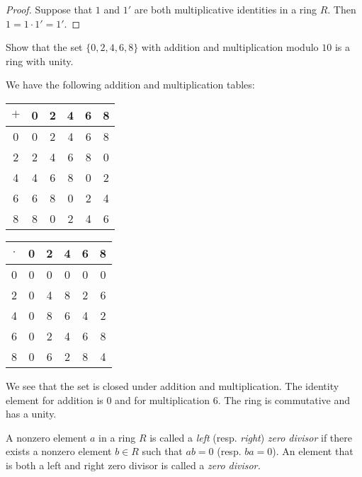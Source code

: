 \begin{proof}
    Suppose that \(1\) and \(1'\) are both multiplicative identities in a ring
    \(R\). Then \(1 = 1 \cdot 1' = 1'\).
\end{proof}

\begin{example}
    Show that the set \(\{0, 2, 4, 6, 8\}\) with addition and multiplication
    modulo \(10\) is a ring with unity.

    \begin{solution}
        We have the following addition and multiplication tables:
        \begin{center}
            \begin{tabular}{c|ccccc}
                \(+\) & 0 & 2 & 4 & 6 & 8 \\
                \hline
                0 & 0 & 2 & 4 & 6 & 8 \\
                2 & 2 & 4 & 6 & 8 & 0 \\
                4 & 4 & 6 & 8 & 0 & 2 \\
                6 & 6 & 8 & 0 & 2 & 4 \\
                8 & 8 & 0 & 2 & 4 & 6
            \end{tabular}
            \quad
            \begin{tabular}{c|ccccc}
                \(\cdot\) & 0 & 2 & 4 & 6 & 8 \\
                \hline
                0 & 0 & 0 & 0 & 0 & 0 \\
                2 & 0 & 4 & 8 & 2 & 6 \\
                4 & 0 & 8 & 6 & 4 & 2 \\
                6 & 0 & 2 & 4 & 6 & 8 \\
                8 & 0 & 6 & 2 & 8 & 4
            \end{tabular}
        \end{center}

        We see that the set is closed under addition and multiplication. The
        identity element for addition is \(0\) and for multiplication \(6\). The
        ring is commutative and has a unity.
    \end{solution}
\end{example}

\begin{definition}
    A nonzero element \(a\) in a ring \(R\) is called a \emph{left} (resp.
    \emph{right}) \emph{zero divisor }if there exists a nonzero element \(b \in
    R\) such that \(ab = 0\) (resp. \(ba = 0\)). An element that is both a left
    and right zero divisor is called a \emph{zero divisor.}
\end{definition}


